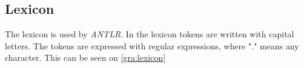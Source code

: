 \subsection{Lexicon}
The lexicon is used by \textit{ANTLR}. In the lexicon tokens are written with capital letters. The tokens are expressed with regular expressions, where "." means any character. This can be seen on \ref{gra:lexicon}